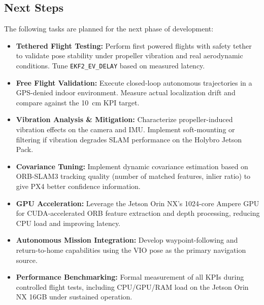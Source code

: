 \subsection{Next Steps}
The following tasks are planned for the next phase of development:
\begin{itemize}
    \item \textbf{Tethered Flight Testing:} Perform first powered flights with safety tether to validate pose stability under propeller vibration and real aerodynamic conditions. Tune \texttt{EKF2\_EV\_DELAY} based on measured latency.
    \item \textbf{Free Flight Validation:} Execute closed-loop autonomous trajectories in a GPS-denied indoor environment. Measure actual localization drift and compare against the 10~cm KPI target.
    \item \textbf{Vibration Analysis \& Mitigation:} Characterize propeller-induced vibration effects on the camera and IMU. Implement soft-mounting or filtering if vibration degrades SLAM performance on the Holybro Jetson Pack.
    \item \textbf{Covariance Tuning:} Implement dynamic covariance estimation based on ORB-SLAM3 tracking quality (number of matched features, inlier ratio) to give PX4 better confidence information.
    \item \textbf{GPU Acceleration:} Leverage the Jetson Orin NX's 1024-core Ampere GPU for CUDA-accelerated ORB feature extraction and depth processing, reducing CPU load and improving latency.
    \item \textbf{Autonomous Mission Integration:} Develop waypoint-following and return-to-home capabilities using the VIO pose as the primary navigation source.
    \item \textbf{Performance Benchmarking:} Formal measurement of all KPIs during controlled flight tests, including CPU/GPU/RAM load on the Jetson Orin NX 16GB under sustained operation.
\end{itemize}
